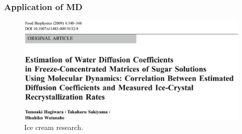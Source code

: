 \documentclass{beamer}
\begin{document}
\begin{frame}
  \frametitle{Application of MD}


\begin{figure}
\includegraphics[scale=0.2]{icecream.eps}
\caption{{\scriptsize  Ice cream research.}}
\end{figure}

\end{frame}
\end{document}
